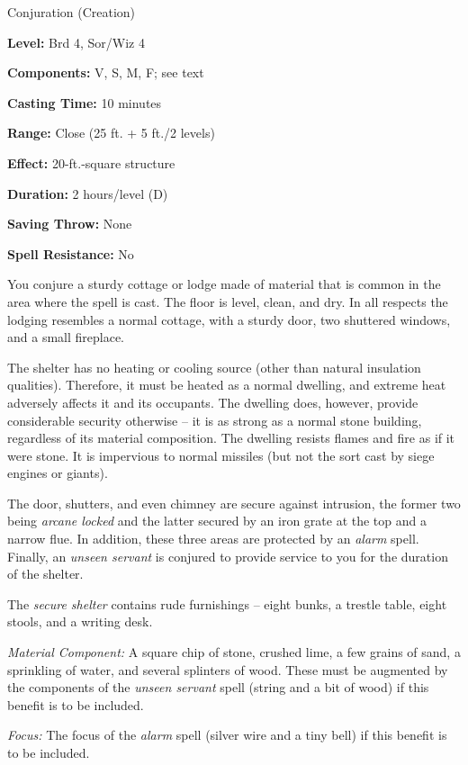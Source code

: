 
Conjuration (Creation)

\textbf{Level:} Brd 4, Sor/Wiz 4

\textbf{Components:} V, S, M, F; see text

\textbf{Casting Time:} 10 minutes

\textbf{Range:} Close (25 ft. + 5 ft./2 levels)

\textbf{Effect:} 20-ft.-square structure

\textbf{Duration:} 2 hours/level (D)

\textbf{Saving Throw:} None

\textbf{Spell Resistance:} No

You conjure a sturdy cottage or lodge made of material that is common in the area 
where the spell is cast. The floor is level, clean, and dry. In all respects the 
lodging resembles a normal cottage, with a sturdy door, two shuttered windows, 
and a small fireplace.

The shelter has no heating or cooling source (other than natural insulation qualities). 
Therefore, it must be heated as a normal dwelling, and extreme heat adversely affects 
it and its occupants. The dwelling does, however, provide considerable security 
otherwise -- it is as strong as a normal stone building, regardless of its material 
composition. The dwelling resists flames and fire as if it were stone. It is impervious 
to normal missiles (but not the sort cast by siege engines or giants).

The door, shutters, and even chimney are secure against intrusion, the former two 
being \textit{arcane locked} and the latter secured by an iron grate at the top 
and a narrow flue. In addition, these three areas are protected by an \textit{alarm 
}spell. Finally, an \textit{unseen servant} is conjured to provide service to you 
for the duration of the shelter.

The \textit{secure shelter} contains rude furnishings  -- eight bunks, a trestle 
table, eight stools, and a writing desk.

\textit{Material Component:} A square chip of stone, crushed lime, a few grains 
of sand, a sprinkling of water, and several splinters of wood. These must be augmented 
by the components of the \textit{unseen servant} spell (string and a bit of wood) 
if this benefit is to be included.

\textit{Focus:} The focus of the \textit{alarm} spell (silver wire and a tiny bell) 
if this benefit is to be included.

